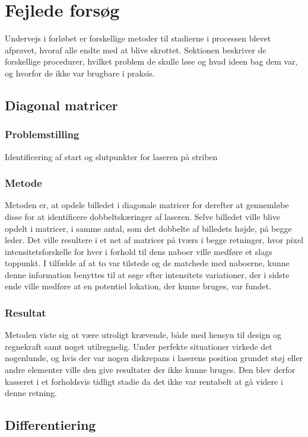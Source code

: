 \section{Fejlede forsøg}
Undervejs i forløbet er forskellige metoder til stadierne i processen blevet afprøvet, hvoraf alle endte med at blive skrottet. Sektionen beskriver de forskellige procedurer, hvilket problem de skulle løse og hvad ideen bag dem var, og hvorfor de ikke var brugbare i praksis.

\subsection{Diagonal matricer}

\subsubsection{Problemstilling}
Identificering af start og slutpunkter for laseren på striben

\subsubsection{Metode}
Metoden er, at opdele billedet i diagonale matricer for derefter at gennemløbe disse for at identificere dobbeltskæringer af laseren. Selve billedet ville blive opdelt i matricer,  i samme antal, som det dobbelte af billedets højde, på begge leder. Det ville resultere i et net af matricer på tværs i begge retninger, hvor pixel intensitetsforskelle for hver i forhold til dens naboer ville medføre et slags toppunkt. I tilfælde af at to var tilstede og de matchede med naboerne, kunne denne information benyttes til at søge efter intensitets variationer, der i sidste ende ville medføre at en potentiel lokation, der kunne bruges, var fundet.

\subsubsection{Resultat}
Metoden viste sig at være utroligt krævende, både med hensyn til design og regnekraft samt noget utilregnelig. Under perfekte situationer virkede det nogenlunde, og hvis der var nogen diskrepans i laserens position grundet støj eller andre elementer ville den give resultater der ikke kunne bruges. Den blev derfor kasseret i et forholdsvis tidligt stadie da det ikke var rentabelt at gå videre i denne retning.

\subsection{Differentiering}

